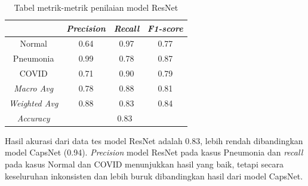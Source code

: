 \documentclass{article}
\begin{document}
   		\begin{table}[H]
   			\begin{center}
   				\begin{tabular}{|c|c|c|c|}
   					\hline
   					& \textit{Precision} & \textit{Recall} & \textit{F1-score} \\
   					\hline
   					Normal & 0.64 & 0.97 & 0.77 \\
   					\hline
   					Pneumonia & 0.99 & 0.78 & 0.87 \\
   					\hline
   					COVID & 0.71 & 0.90 & 0.79 \\
   					\hline
   					\hline
   					\textit{Macro Avg} & 0.78 & 0.88 & 0.81 \\
   					\hline
   					\textit{Weighted Avg} & 0.88 & 0.83 & 0.84 \\
   					\hline
   					\hline
   					\textit{Accuracy} & \multicolumn{3}{|c|}{0.83} \\
   					\hline
   				\end{tabular}
   				\caption{Tabel metrik-metrik penilaian model ResNet}
   			\end{center}
   		\end{table}
   		\par Hasil akurasi dari data tes model ResNet adalah 0.83, lebih rendah dibandingkan model CapsNet (0.94). \textit{Precision} model ResNet pada kasus Pneumonia dan \textit{recall} pada kasus Normal dan COVID menunjukkan hasil yang baik, tetapi secara keseluruhan inkonsisten dan lebih buruk dibandingkan hasil dari model CapsNet.
   		
\end{document}
